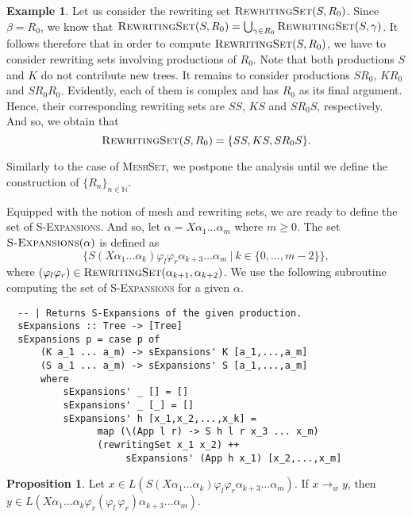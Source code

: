 \documentclass[11pt,a4paper]{amsart}
\theoremstyle{definition}
\newtheorem{prop}[theorem]{Proposition}
\newtheorem{example}[theorem]{Example}
\newcommand{\SExpansions}[1]{\textsc{S-Expansions}(#1)}
\newcommand{\RewritingSet}[2]{\textsc{RewritingSet}(#1,#2)}
\begin{document}
\begin{example}
Let us consider the rewriting set $\RewritingSet{S}{R_0}$. Since $\beta = R_0$, we know that $\RewritingSet{S}{R_0} = \bigcup_{\gamma \in R_0} \RewritingSet{S}{\gamma}$.
It follows therefore that in order to compute $\RewritingSet{S}{R_0}$, we have to consider rewriting sets involving productions of $R_0$. Note that both productions $S$ and $K$ do not contribute new trees. It remains to consider productions $S R_0$, $K R_0$ and $S R_0 R_0$. Evidently, each of them is complex and has $R_0$ as its final argument. Hence, their corresponding rewriting sets are $S S$, $K S$ and $S R_0 S$, respectively. And so, we obtain that
\[ \RewritingSet{S}{R_0} = \{S S, K S, S R_0 S\}. \]
\end{example}

Similarly to the case of \textsc{MeshSet}, we postpone the analysis until we define the construction of ${\{R_n\}}_{n \in \mathbb{N}}$.

Equipped with the notion of mesh and rewriting sets, we are ready to define the set of \textsc{S-Expansions}. And so, let $\alpha = X \alpha_1 \ldots \alpha_m$ where $m \geq 0$. The set $\SExpansions{\alpha}$ is defined as
\[ \Big\{ S(X \alpha_1 \ldots \alpha_k) \varphi_l
                \varphi_r \alpha_{k+3} \ldots \alpha_m~|~k \in \{0,\ldots,m-2\} \Big\}, \]
where $(\varphi_l \varphi_r) \in \RewritingSet{\alpha_{k+1}}{\alpha_{k+2}}$. We use the following subroutine computing the set of \textsc{S-Expansions} for a given $\alpha$.

\begin{lstlisting}
  -- | Returns S-Expansions of the given production.
  sExpansions :: Tree -> [Tree]
  sExpansions p = case p of
      (K a_1 ... a_m) -> sExpansions' K [a_1,...,a_m]
      (S a_1 ... a_m) -> sExpansions' S [a_1,...,a_m]
      where
          sExpansions' _ [] = []
          sExpansions' _ [_] = []
          sExpansions' h [x_1,x_2,...,x_k] =
                map (\(App l r) -> S h l r x_3 ... x_m) 
                (rewritingSet x_1 x_2) ++
                     sExpansions' (App h x_1) [x_2,...,x_m]
\end{lstlisting}

\begin{prop}\label{prop-S}
 Let $x \in L(S(X \alpha_1 \ldots \alpha_k) \varphi_l
 \varphi_r \alpha_{k+3} \ldots \alpha_m)$. If $x \to_w y$, then\\ $y \in L(X
 \alpha_1 \ldots \alpha_k \varphi_r (\varphi_l\, \varphi_r) \alpha_{k+3} \ldots
 \alpha_m)$.
\end{prop}
\end{document}

